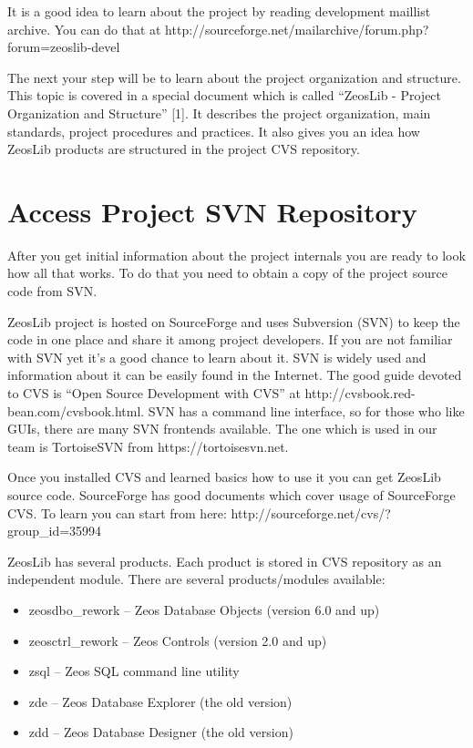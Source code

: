 \documentclass[a4paper,12pt,oneside]{book}
\begin{document}
It is a good idea to learn about the project by reading development maillist archive.
You can do that at http://sourceforge.net/mailarchive/forum.php?forum=zeoslib-devel

The next your step will be to learn about the project organization and structure.
This topic is covered in a special document which is called “ZeosLib - Project Organization and Structure” [1].
It describes the project organization, main standards, project procedures and practices.
It also gives you an idea how ZeosLib products are structured in the project CVS repository.

\section{Access Project SVN Repository}
After you get initial information about the project internals you are ready to look how all that works.
To do that you need to obtain a copy of the project source code from SVN.

ZeosLib project is hosted on SourceForge and uses Subversion (SVN) to keep the code in one place and share it among project developers.
If you are not familiar with SVN yet it’s a good chance to learn about it.
SVN is widely used and information about it can be easily found in the Internet.
The good guide devoted to CVS is “Open Source Development with CVS” at http://cvsbook.red-bean.com/cvsbook.html.
SVN has a command line interface, so for those who like GUIs, there are many SVN frontends available.
The one which is used in our team is TortoiseSVN from https://tortoisesvn.net.

Once you installed CVS and learned basics how to use it you can get ZeosLib source code.
SourceForge has good documents which cover usage of SourceForge CVS.
To learn you can start from here: http://sourceforge.net/cvs/?group\_id=35994

ZeosLib has several products.
Each product is stored in CVS repository as an independent module.
There are several products/modules available:
\begin{itemize}
  \item zeosdbo\_rework – Zeos Database Objects (version 6.0 and up)
	\item zeosctrl\_rework – Zeos Controls (version 2.0 and up)
	\item zsql – Zeos SQL command line utility
	\item zde – Zeos Database Explorer (the old version)
	\item zdd – Zeos Database Designer (the old version)
\end{itemize}
\end{document}
